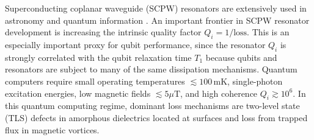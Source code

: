 Superconducting coplanar waveguide (SCPW) resonators are extensively used in astronomy\cite{day2003,mazin2012} and quantum information \cite{mariantoni2011,barends2013,jeffrey2014}.  An important frontier in SCPW resonator development is increasing the intrinsic quality factor $Q_i = 1/\text{loss}$.  This is an especially important proxy for qubit performance, since the resonator $Q_i$ is strongly correlated with the qubit relaxation time $T_1$ because qubits and resonators are subject to many of the same dissipation mechanisms.\cite{wang2015, wisbey2010, song2009a, wang2014, nsanzineza2014, martinis2005, martinis2009, gao2008}  Quantum computers require small operating temperatures $\lesssim 100\,\textrm{mK}$, single-photon excitation energies, low magnetic fields $\lesssim 5\mu\textrm{T}$, and high coherence  $Q_i \gtrsim 10^{6}$.  In this quantum computing regime, dominant loss mechanisms are two-level state (TLS) defects in amorphous dielectrics located at surfaces and loss from trapped flux in magnetic vortices.  


